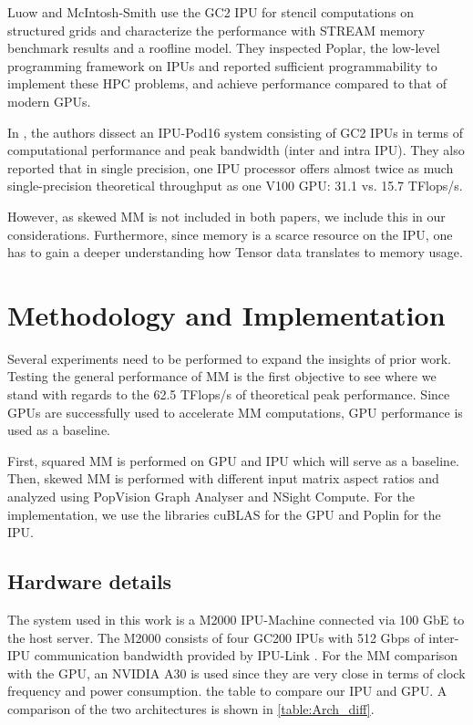 \documentclass[a4paper,UKenglish,cleveref, autoref, thm-restate]{oasics-v2021}
\begin{document}
Luow and McIntosh-Smith \cite{IPU_HPC} use the GC2 IPU for stencil computations on structured grids and characterize the performance with STREAM memory benchmark results and a roofline model. They inspected Poplar, the low-level programming framework on IPUs and reported sufficient programmability to implement these HPC problems, and achieve performance compared to that of modern GPUs.

In \cite{IPUDiss}, the authors dissect an IPU-Pod16 system consisting of GC2 IPUs in terms of computational performance and peak bandwidth (inter and intra IPU). They also reported that in single precision, one IPU processor offers almost twice as much single-precision theoretical throughput as one V100 GPU: 31.1 vs. 15.7 TFlops/s.

However, as skewed MM is not included in both papers, we include this in our considerations. 
Furthermore, since memory is a scarce resource on the IPU, one has to gain a deeper understanding how Tensor data translates to memory usage.


\section{Methodology and Implementation}
Several experiments need to be performed to expand the insights of prior work. Testing the general performance of MM is the first objective to see where we stand with regards to the 62.5 TFlops/s of theoretical peak performance. Since GPUs are successfully used to accelerate MM computations, GPU performance is used as a baseline.

First, squared MM is performed on GPU and IPU which will serve as a baseline. Then, skewed MM is performed with different input matrix aspect ratios and analyzed using PopVision Graph Analyser and NSight Compute. For the implementation, we use the libraries cuBLAS for the GPU and Poplin for the IPU.

\subsection{Hardware details}
The system used in this work is a M2000 IPU-Machine connected via 100 GbE to the host server. The M2000 consists of four GC200 IPUs with 512 Gbps of inter-IPU communication bandwidth provided by IPU-Link \cite{b9}. For the MM comparison with the GPU, an NVIDIA A30 is used since they are very close in terms of clock frequency and power consumption. the table to compare our IPU and GPU. A comparison of the two architectures is shown in \ref{table:Arch_diff}.
\end{document}
